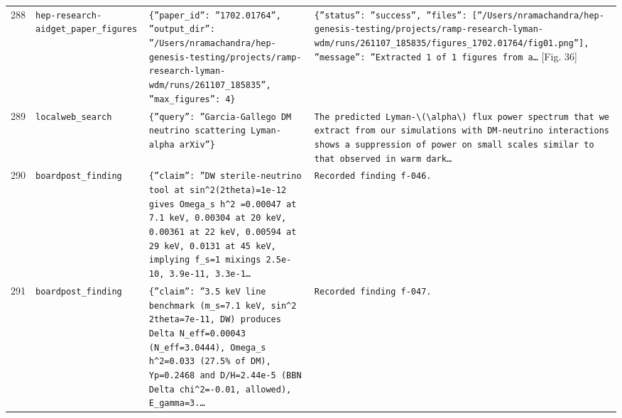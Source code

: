 \documentclass[11pt,a4paper]{article}
\begin{document}
\begin{longtable}{@{}p{}p{}p{}p{}@{}}
288 & \texttt{hep-research-aid}\newline\texttt{get\_\allowbreak{}paper\_\allowbreak{}figures} & \texttt{\{''paper\_\allowbreak{}id'':\allowbreak{} ''1702.01764'',\allowbreak{} ''output\_\allowbreak{}dir'':\allowbreak{} ''/\allowbreak{}Users/\allowbreak{}nramachandra/\allowbreak{}hep-genesis-testing/\allowbreak{}projects/\allowbreak{}ramp-research-lyman-wdm/\allowbreak{}runs/\allowbreak{}261107\_\allowbreak{}185835'',\allowbreak{} ''max\_\allowbreak{}figures'':\allowbreak{} 4\}\allowbreak{}} & \texttt{\{''status'':\allowbreak{} ''success'',\allowbreak{} ''files'':\allowbreak{} [''/\allowbreak{}Users/\allowbreak{}nramachandra/\allowbreak{}hep-genesis-testing/\allowbreak{}projects/\allowbreak{}ramp-research-lyman-wdm/\allowbreak{}runs/\allowbreak{}261107\_\allowbreak{}185835/\allowbreak{}figures\_\allowbreak{}1702.01764/\allowbreak{}fig01.png'']\allowbreak{},\allowbreak{} ''message'':\allowbreak{} ''Extracted 1 of 1 figures from a\ldots{}\allowbreak{}} [Fig. 36] \\
289 & \texttt{local}\newline\texttt{web\_\allowbreak{}search} & \texttt{\{''query'':\allowbreak{} ''Garcia-Gallego DM neutrino scattering Lyman-alpha arXiv''\}\allowbreak{}} & \texttt{The predicted Lyman-\textbackslash{}\allowbreak{}(\textbackslash{}\allowbreak{}alpha\textbackslash{}\allowbreak{})\allowbreak{} flux power spectrum that we extract from our simulations with DM-neutrino interactions shows a suppression of power on small scales similar to that observed in warm dark\ldots{}\allowbreak{}} \\
290 & \texttt{board}\newline\texttt{post\_\allowbreak{}finding} & \texttt{\{''claim'':\allowbreak{} ''DW sterile-neutrino tool at sin\textasciicircum{}\allowbreak{}2(2theta)\allowbreak{}=\allowbreak{}1e-12 gives Omega\_\allowbreak{}s h\textasciicircum{}\allowbreak{}2 =\allowbreak{}0.00047 at 7.1 keV,\allowbreak{} 0.00304 at 20 keV,\allowbreak{} 0.00361 at 22 keV,\allowbreak{} 0.00594 at 29 keV,\allowbreak{} 0.0131 at 45 keV,\allowbreak{} implying f\_\allowbreak{}s=\allowbreak{}1 mixings 2.5e-10,\allowbreak{} 3.9e-11,\allowbreak{} 3.3e-1\ldots{}\allowbreak{}} & \texttt{Recorded finding f-046.} \\
291 & \texttt{board}\newline\texttt{post\_\allowbreak{}finding} & \texttt{\{''claim'':\allowbreak{} ''3.5 keV line benchmark (m\_\allowbreak{}s=\allowbreak{}7.1 keV,\allowbreak{} sin\textasciicircum{}\allowbreak{}2 2theta=\allowbreak{}7e-11,\allowbreak{} DW)\allowbreak{} produces Delta N\_\allowbreak{}eff=\allowbreak{}0.00043 (N\_\allowbreak{}eff=\allowbreak{}3.0444)\allowbreak{},\allowbreak{} Omega\_\allowbreak{}s h\textasciicircum{}\allowbreak{}2=\allowbreak{}0.033 (27.5\% of DM)\allowbreak{},\allowbreak{} Yp=\allowbreak{}0.2468 and D/\allowbreak{}H=\allowbreak{}2.44e-5 (BBN Delta chi\textasciicircum{}\allowbreak{}2=\allowbreak{}-0.01,\allowbreak{} allowed)\allowbreak{},\allowbreak{} E\_\allowbreak{}gamma=\allowbreak{}3.\ldots{}\allowbreak{}} & \texttt{Recorded finding f-047.} \\

\end{longtable}
\end{document}
